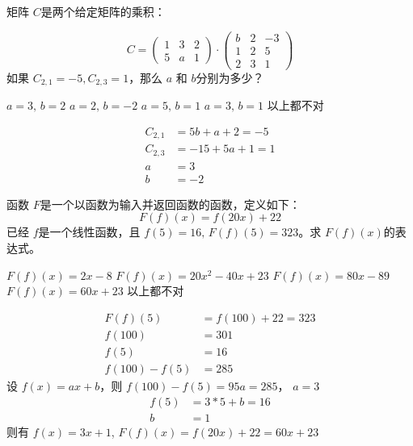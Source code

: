 \documentclass[answers]{exam}
\begin{document}
\begin{questions}
	\question 矩阵 \( C \)是两个给定矩阵的乘积：

	\begin{equation*}
		C =
		\begin{pmatrix}
			1 & 3 & 2 \\
			5 & a & 1
		\end{pmatrix} \cdot
		\begin{pmatrix}
			b & 2 & -3 \\
			1 & 2 & 5  \\
			2 & 3 & 1
		\end{pmatrix}
	\end{equation*}
	如果 \( C_{2,1} = -5, C_{2,3} = 1 \)，那么 \( a \) 和 \( b \)分别为多少？

	\begin{oneparchoices}
		\choice \( a = 3,\, b = 2 \)
		\choice \( a = 2,\, b = -2 \)
		\choice \( a = 5,\, b = 1 \)
		\choice \( a = 3,\, b = 1 \)
		\CorrectChoice 以上都不对
	\end{oneparchoices}

	\begin{solution}
		\begin{align*}
			C_{2,1} & = 5b + a + 2 = -5  \\
			C_{2,3} & = -15 + 5a + 1 = 1 \\
			a       & = 3                \\
			b       & = -2
		\end{align*}
	\end{solution}

	\question 函数 \( F \)是一个以函数为输入并返回函数的函数，定义如下：
	\begin{equation*}
		F(f)(x) = f(20x) + 22
	\end{equation*}
	已经 \( f \)是一个线性函数，且 \( f(5) = 16,\, F(f)(5) = 323 \)。求 \( F(f)(x) \)的表达式。

	\begin{choices}
		\choice \( F(f)(x) = 2x - 8 \)
		\choice \( F(f)(x) = 20x^2 -40x + 23 \)
		\choice \( F(f)(x) = 80x - 89 \)
		\CorrectChoice \( F(f)(x) = 60x + 23 \)
		\choice 以上都不对
	\end{choices}

	\begin{solution}
		\begin{align*}
			F(f)(5)       & = f(100) + 22  = 323 \\
			f(100)        & = 301                \\
			f(5)          & = 16                 \\
			f(100) - f(5) & = 285
		\end{align*}
		设 \( f(x) = ax + b \)，则 \( f(100) - f(5) = 95a = 285\)， \( a =3 \)
		\begin{align*}
			f(5) & = 3 * 5 + b  = 16 \\
			b    & = 1
		\end{align*}
		则有 \( f(x) = 3x + 1 \), \( F(f)(x) = f(20x) + 22 = 60x + 23\)
	\end{solution}


\end{questions}
\end{document}
